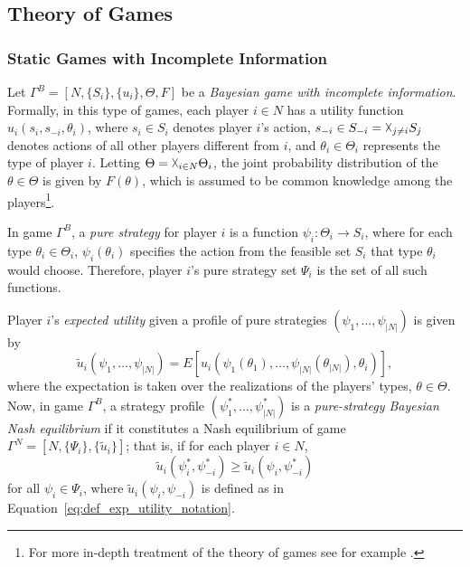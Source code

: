 \subsection{Theory of Games} %
\label{sub:theory_of_games_notation}

\subsubsection{Static Games with Incomplete Information} %
\label{ssub:static_games_with_incomplete_information_notation}
Let $\Gamma^B = [N, \{S_i\}, \{u_i\},\Theta,F]$ be a \emph{Bayesian game with incomplete information}. Formally, in this type of games, each player $i\in N$ has a utility function $u_i(s_i, s_{-i}, \theta_i)$, where $s_i\in S_i$ denotes player $i$'s action, $s_{-i}\in S_{-i} = \vartimes_{j\neq i}S_j$ denotes actions of all other players different from $i$, and $\theta_i\in\Theta_i$ represents the type of player $i$. Letting $\Theta = \vartimes_{i\in N} \Theta_i$, the joint probability distribution of the $\theta\in\Theta$ is given by $F(\theta)$, which is assumed to be common knowledge among the players\footnote{For more in-depth treatment of the theory of games see for example \cite{Myerson97, Gibbons92, MicroTheory}.}.

In game $\Gamma^B$, a \emph{pure strategy} for player $i$ is a function $\psi_i: \Theta_i\to S_i$, where for each type $\theta_i\in \Theta_i$, $\psi_i(\theta_i)$ specifies the action from the feasible set $S_i$ that type $\theta_i$ would choose. Therefore, player $i$'s pure strategy set $\Psi_i$ is the set of all such functions.

Player $i$'s \emph{expected utility} given a profile of pure strategies $(\psi_1,\ldots,\psi_{|N|})$ is given by
\begin{equation}
	\label{eq:def_exp_utility_notation}
	\tilde{u}_i(\psi_1,\ldots,\psi_{|N|}) = E[u_i(\psi_1(\theta_1),\ldots,\psi_{|N|}(\theta_{|N|}),\theta_i)],
\end{equation}
where the expectation is taken over the realizations of the players' types, $\theta\in\Theta$. Now, in game $\Gamma^B$, a strategy profile $(\psi_1^*,\ldots,\psi_{|N|}^*)$ is a \emph{pure-strategy Bayesian Nash equilibrium} if it constitutes a Nash equilibrium of game $\Gamma^N = [N, \{\Psi_i\},\{\tilde{u}_i\}]$; that is, if for each player $i\in N$,
\begin{equation}
	\label{eq:def_bayesian_nash_eq_notation}
	\tilde{u}_i(\psi^*_i,\psi^*_{-i}) \ge \tilde{u}_i(\psi_i,\psi^*_{-i})
\end{equation}
for all $\psi_i\in\Psi_i$, where $\tilde{u}_i(\psi_i,\psi_{-i})$ is defined as in Equation~\eqref{eq:def_exp_utility_notation}.

